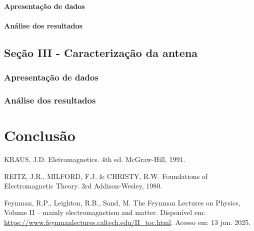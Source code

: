 \documentclass[12pt]{article}
\begin{document}
\paragraph{Apresentação de dados}
\paragraph{Análise dos resultados}

\subsection{Seção III - Caracterização da antena}
\subsubsection{Apresentação de dados}
\subsubsection{Análise dos resultados}

\clearpage
\section{Conclusão}

\clearpage
\begin{thebibliography}{9}
  KRAUS, J.D. Eletromagnetics. 4th ed. McGraw-Hill, 1991.

  REITZ, J.R., MILFORD, F.J. \& CHRISTY, R.W. Foundations of
  Electromagnetic Theory. 3rd Addison-Wesley, 1980.

  Feynman, R.P., Leighton, R.B., Sand, M. The Feynman Lectures on
  Physics, Volume II – mainly electromagnetism and matter. Disponível
  em: \url{https://www.feynmanlectures.caltech.edu/II_toc.html}.
  Acesso em: 13 jun. 2025.
\end{thebibliography}
\end{document}
